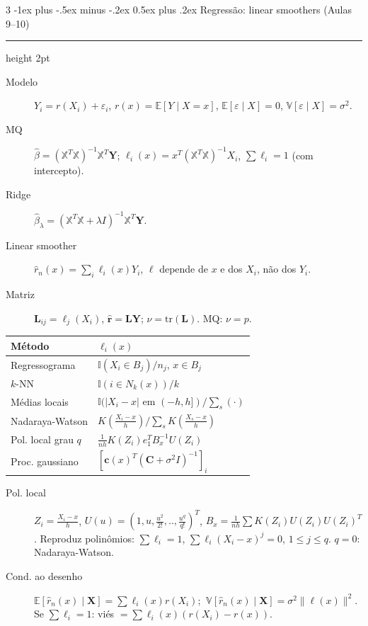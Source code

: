 \documentclass[10pt,landscape]{article}
\makeatletter
\newcommand{\E}{\mathbb{E}}
\newcommand{\V}{\mathbb{V}}
\newcommand{\I}{\mathbb{I}}
\newcommand{\tr}{\textrm{tr}}
\newcommand{\X}{\mathbf{X}}
\renewcommand{\section}{\@startsection{section}{1}{0mm}%
                                {-1ex plus -.5ex minus -.2ex}%
                                {0.5ex plus .2ex}%
                                {\normalfont\small\bfseries}}
\newcommand{\secrule}{\smallskip \hrule height 2pt \smallskip}
\makeatother
\begin{document}
\begin{multicols}{3}
\section{Regressão: linear smoothers (Aulas 9--10)}\secrule
\begin{description}
  \item[Modelo] $Y_i=r(X_i)+\varepsilon_i$, $r(x)=\E[Y\mid X=x]$, $\E[\varepsilon\mid X]=0$, $\V[\varepsilon\mid X]=\sigma^2$.
  \item[MQ] $\hat\beta=(\mathbb X^T\mathbb X)^{-1}\mathbb X^T\mathbf Y$; $\ell_i(x)=x^T(\mathbb X^T\mathbb X)^{-1}X_i$, $\sum\ell_i=1$ (com intercepto).
  \item[Ridge] $\hat\beta_\lambda=(\mathbb X^T\mathbb X+\lambda I)^{-1}\mathbb X^T\mathbf Y$.
  \item[Linear smoother] $\hat r_n(x)=\sum_i\ell_i(x)Y_i$, $\ell$ depende de $x$ e dos $X_i$, não dos $Y_i$.
  \item[Matriz] $\mathbf L_{ij}=\ell_j(X_i)$, $\hat{\mathbf r}=\mathbf L\mathbf Y$; $\nu=\tr(\mathbf L)$. MQ: $\nu=p$.
\end{description}
\begin{center}
\begin{tabular}{ll}
\toprule
Método & $\ell_i(x)$ \\
\midrule
Regressograma & $\I(X_i\in B_j)/n_j$, $x\in B_j$ \\
$k$-NN & $\I(i\in N_k(x))/k$ \\
Médias locais & $\I(|X_i-x|\text{ em }(-h,h])/\sum_s(\cdot)$ \\
Nadaraya-Watson & $K(\frac{X_i-x}h)/\sum_sK(\frac{X_s-x}h)$ \\
Pol. local grau $q$ & $\frac1{nh}K(Z_i)e_1^TB_x^{-1}U(Z_i)$ \\
Proc. gaussiano & $[\mathbf c(x)^T(\mathbf C+\sigma^2I)^{-1}]_i$ \\
\bottomrule
\end{tabular}
\end{center}
\begin{description}
  \item[Pol. local] $Z_i=\frac{X_i-x}h$, $U(u)=(1,u,\frac{u^2}{2!},..,\frac{u^q}{q!})^T$, $B_x=\frac1{nh}\sum K(Z_i)U(Z_i)U(Z_i)^T$. Reproduz polinômios: $\sum\ell_i=1$, $\sum\ell_i(X_i-x)^j=0$, $1\le j\le q$. $q=0$: Nadaraya-Watson.
  \item[Cond. ao desenho] $\E[\hat r_n(x)\mid\X]=\sum\ell_i(x)r(X_i)$; $\ \V[\hat r_n(x)\mid\X]=\sigma^2\|\ell(x)\|^2$. Se $\sum\ell_i=1$: viés $=\sum\ell_i(x)(r(X_i)-r(x))$.
\end{description}


\end{multicols}
\end{document}
